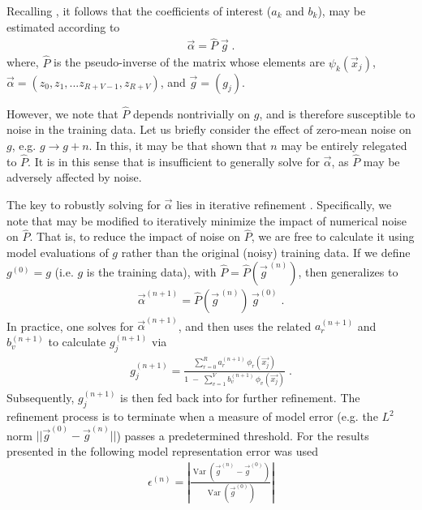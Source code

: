 \documentclass[twocolumn,aps,prd,floatfix,preprintnumbers,a4paper,nofootinbib,
superscriptaddress,10pt]{revtex4-1}
\begin{document}
%
\par Recalling , it follows that the coefficients of interest ($a_k$ and $b_k$), may be estimated according to
%
\begin{align}
  \label{eq:pinv2}
  \vec{\alpha} = \hat{P} \; \vec{g} \;.
\end{align}
%
where, $\hat{P}$ is the pseudo-inverse of the matrix whose elements are $\psi_k(\vec{x}_j)$, $\vec\alpha = ( z_0, z_1, ... z_{R+V-1},z_{R+V} )$, and $\vec{g} = ( g_j )$.
%
\par However, we note that $\hat{P}$ depends nontrivially on $g$, and is therefore susceptible to noise in the training data.
%
Let us briefly consider the effect of zero-mean noise on $g$, e.g. $g \rightarrow g+n$.
%
In this, it may be that shown that $n$ may be entirely relegated to $\hat{P}$.
%
It is in this sense that  is insufficient to generally solve for $\vec{\alpha}$, as $\hat{P}$ may be adversely affected by noise.
%
%
\par The key to robustly solving for $\vec{\alpha}$ lies in iterative refinement \cite{Press:1992:NRC:148286}.
%
Specifically, we note that  may be modified to iteratively minimize the impact of numerical noise on $\hat{P}$.
%
That is, to reduce the impact of noise on $\hat{P}$, we are free to calculate it using model evaluations of $g$ rather than the original (noisy) training data.
%
If we define $g^{(0)}=g$ (i.e. $g$ is the training data), with $\hat{P} = \hat{P}( \vec{g}^{\,(n)} )$, then  generalizes to
%
\begin{align}
  \label{eq:pinv3}
  \vec{\alpha}^{(n+1)} = \hat{P}(\vec{g}^{\,(n)}) \, \vec{g}^{(0)}\;.
\end{align}
%
In practice, one solves  for $\vec{\alpha}^{(n+1)}$, and then uses the related $a_r^{(n+1)}$ and $b_v^{(n+1)}$ to calculate $g_j^{(n+1)}$ via
%
\begin{align}
  \label{eq:rat4}
  g_j^{(n+1)} =  \frac{ \sum_{r=0}^{R} a^{(n+1)}_r \, \phi_{r}(\vec{x_j}) }{ 1\;-\;  \sum_{v=1}^{V} b^{(n+1)}_v \, \phi_{v}(\vec{x_j}) } \; .
\end{align}
%
Subsequently, $g_j^{(n+1)}$ is then fed back into  for further refinement.
%
The refinement process is to terminate when a measure of model error (e.g. the $L^2$ norm $||\vec{g}^{(0)}-\vec{g}^{(n)}||$) passes a predetermined threshold. For the results presented in  the following model representation error was used
%
\begin{align}
  \label{eq:raterr}
  \epsilon^{(n)}  = \left|\frac{\operatorname{Var}\left(\vec{g}^{(n)} - \vec{g}^{(0)}\right)}{\operatorname{Var}\left(\vec{g}^{(0)}\right)}\right|
\end{align}
\end{document}

